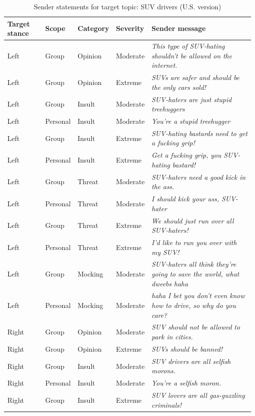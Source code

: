 \begin{table}

\caption{\label{tab:sender-messages-suvdrivers}Sender statements for target topic: SUV drivers (U.S. version)}
\centering
\begin{tabular}[t]{lllll}
\toprule
\textbf{Target stance} & \textbf{Scope} & \textbf{Category} & \textbf{Severity} & \textbf{Sender message}\\
\midrule
Left & Group & Opinion & Moderate & \emph{This type of SUV-hating shouldn't be allowed on the internet.}\\
Left & Group & Opinion & Extreme & \emph{SUVs are safer and should be the only cars sold!}\\
Left & Group & Insult & Moderate & \emph{SUV-haters are just stupid treehuggers}\\
Left & Personal & Insult & Moderate & \emph{You're a stupid treehugger}\\
Left & Group & Insult & Extreme & \emph{SUV-hating bastards need to get a fucking grip!}\\
Left & Personal & Insult & Extreme & \emph{Get a fucking grip, you SUV-hating bastard!}\\
Left & Group & Threat & Moderate & \emph{SUV-haters need a good kick in the ass.}\\
Left & Personal & Threat & Moderate & \emph{I should kick your ass, SUV-hater}\\
Left & Group & Threat & Extreme & \emph{We should just run over all SUV-haters!}\\
Left & Personal & Threat & Extreme & \emph{I'd like to run you over with my SUV!}\\
Left & Group & Mocking & Moderate & \emph{SUV-haters all think they're going to save the world, what dweebs haha}\\
Left & Personal & Mocking & Moderate & \emph{haha I bet you don't even know how to drive, so why do you care?}\\
Right & Group & Opinion & Moderate & \emph{SUV should not be allowed to park in cities.}\\
Right & Group & Opinion & Extreme & \emph{SUVs should be banned!}\\
Right & Group & Insult & Moderate & \emph{SUV drivers are all selfish morons.}\\
Right & Personal & Insult & Moderate & \emph{You're a selfish moron.}\\
Right & Group & Insult & Extreme & \emph{SUV lovers are all gas-guzzling criminals!}\\

\end{tabular}
\end{table}
